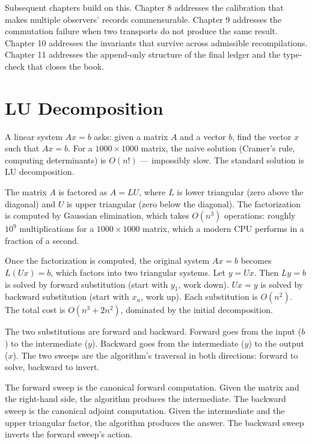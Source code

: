 \begin{chapteressay}
Subsequent chapters build on this. Chapter 8 addresses the
calibration that makes multiple observers' records commensurable.
Chapter 9 addresses the commutation failure when two transports
do not produce the same result. Chapter 10 addresses the
invariants that survive across admissible recompilations. Chapter
11 addresses the append-only structure of the final ledger and
the type-check that closes the book.

\end{chapteressay}

\section{LU Decomposition}
\label{se:lu-decomposition}

A linear system $Ax = b$ asks: given a matrix $A$ and a vector $b$,
find the vector $x$ such that $Ax = b$. For a $1000 \times 1000$ matrix,
the naive solution (Cramer's rule, computing determinants) is
$O(n!)$ --- impossibly slow. The standard solution is LU
decomposition.

The matrix $A$ is factored as $A = LU$, where $L$ is lower triangular
(zero above the diagonal) and $U$ is upper triangular (zero below the
diagonal). The factorization is computed by Gaussian elimination,
which takes $O(n^3)$ operations: roughly $10^9$ multiplications for a
$1000 \times 1000$ matrix, which a modern CPU performs in a fraction
of a second.

Once the factorization is computed, the original system $Ax = b$
becomes $L(Ux) = b$, which factors into two triangular systems. Let
$y = Ux$. Then $Ly = b$ is solved by forward substitution (start with
$y_1$, work down). $Ux = y$ is solved by backward substitution (start
with $x_n$, work up). Each substitution is $O(n^2)$. The total cost
is $O(n^3 + 2n^2)$, dominated by the initial decomposition.

The two substitutions are forward and backward. Forward goes from the
input ($b$) to the intermediate ($y$). Backward goes from the
intermediate ($y$) to the output ($x$). The two sweeps are the
algorithm's traversal in both directions: forward to solve, backward
to invert.

The forward sweep is the canonical forward computation. Given the
matrix and the right-hand side, the algorithm produces the
intermediate. The backward sweep is the canonical adjoint
computation. Given the intermediate and the upper triangular factor,
the algorithm produces the answer. The backward sweep inverts the
forward sweep's action.


